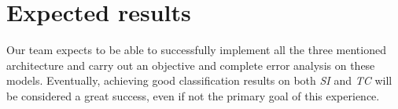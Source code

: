 \documentclass[11pt]{article}
\begin{document}
\section{Expected results}
Our team expects to be able to successfully implement all the three mentioned architecture and carry out an objective and complete error analysis on these models. Eventually, achieving good classification results on both \textit{SI} and \textit{TC} will be considered a great success, even if not the primary goal of this experience.

\nocite{}




\end{document}
